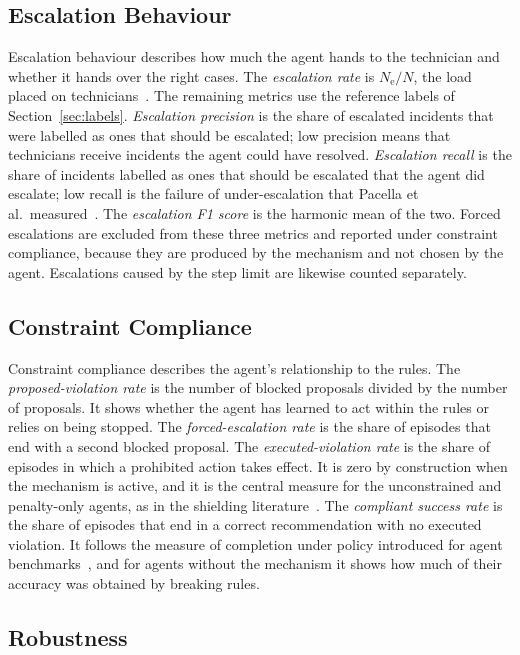 \documentclass[12pt,a4paper]{article}
\begin{document}
\subsection{Escalation Behaviour}

Escalation behaviour describes how much the agent hands to the technician and whether it hands over the right cases. The \emph{escalation rate} is $N_{\text{e}} / N$, the load placed on technicians~\cite{turan2026}. The remaining metrics use the reference labels of Section~\ref{sec:labels}. \emph{Escalation precision} is the share of escalated incidents that were labelled as ones that should be escalated; low precision means that technicians receive incidents the agent could have resolved. \emph{Escalation recall} is the share of incidents labelled as ones that should be escalated that the agent did escalate; low recall is the failure of under-escalation that Pacella et al.\ measured~\cite{pacella2026}. The \emph{escalation F1 score} is the harmonic mean of the two. Forced escalations are excluded from these three metrics and reported under constraint compliance, because they are produced by the mechanism and not chosen by the agent. Escalations caused by the step limit are likewise counted separately.

\subsection{Constraint Compliance}

Constraint compliance describes the agent's relationship to the rules. The \emph{proposed-violation rate} is the number of blocked proposals divided by the number of proposals. It shows whether the agent has learned to act within the rules or relies on being stopped. The \emph{forced-escalation rate} is the share of episodes that end with a second blocked proposal. The \emph{executed-violation rate} is the share of episodes in which a prohibited action takes effect. It is zero by construction when the mechanism is active, and it is the central measure for the unconstrained and penalty-only agents, as in the shielding literature~\cite{alshiekh2018,jansen2020}. The \emph{compliant success rate} is the share of episodes that end in a correct recommendation with no executed violation. It follows the measure of completion under policy introduced for agent benchmarks~\cite{levy2026}, and for agents without the mechanism it shows how much of their accuracy was obtained by breaking rules.

\subsection{Robustness}
\end{document}
